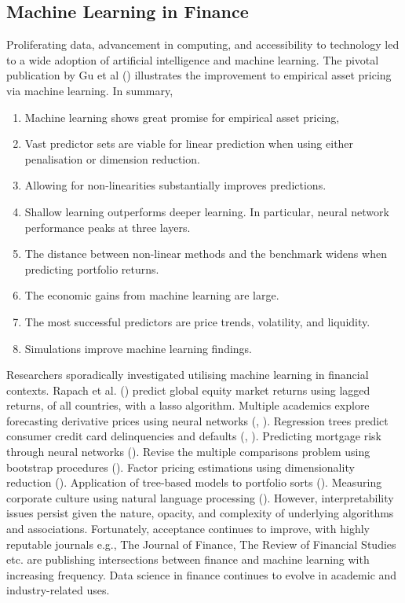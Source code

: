 \documentclass[12pt]{article}
\begin{document}
\subsection{Machine Learning in Finance}
Proliferating data, advancement in computing, and accessibility to technology led to a wide adoption of artificial intelligence and machine learning.
The pivotal publication by Gu et al (\citeyear{eapvml}) illustrates the improvement to empirical asset pricing via machine learning.
In summary,
\singlespacing
\begin{enumerate}
	\item Machine learning shows great promise for empirical asset pricing,
	\item Vast predictor sets are viable for linear prediction when using either penalisation or dimension reduction.
	\item Allowing for non-linearities substantially improves predictions.
	\item Shallow learning outperforms deeper learning. In particular, neural network performance peaks at three layers.
	\item The distance between non-linear methods and the benchmark widens when predicting portfolio returns.
	\item The economic gains from machine learning are large.
	\item The most successful predictors are price trends, volatility, and liquidity.
	\item Simulations improve machine learning findings.
\end{enumerate}
\doublespacing
Researchers sporadically investigated utilising machine learning in financial contexts.
Rapach et al. (\citeyear{rapach2013international}) predict global equity market returns using lagged returns, of all countries, with a lasso algorithm.
Multiple academics explore forecasting derivative prices using neural networks (\cite{fleck1994strain}, \cite{cai2000functional}).
Regression trees predict consumer credit card delinquencies and defaults (\cite{khandani2010consumer}, \cite{butaru2016risk}).
Predicting mortgage risk through neural networks (\cite{sirignano2016deep}).
Revise the multiple comparisons problem using bootstrap procedures (\cite{harvey2016and}).
Factor pricing estimations using dimensionality reduction (\cite{feng2020taming}).
Application of tree-based models to portfolio sorts (\cite{moritz2016tree}).
Measuring corporate culture using natural language processing (\cite{corporate-culture}).
However, interpretability issues persist given the nature, opacity, and complexity of underlying algorithms and associations.
Fortunately, acceptance continues to improve, with highly reputable journals e.g.,
The Journal of Finance, The Review of Financial Studies etc. are publishing intersections between finance and machine learning with increasing frequency.
Data science in finance continues to evolve in academic and industry-related uses.
\end{document}
